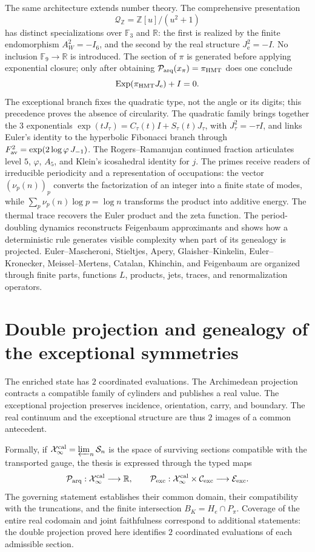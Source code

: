 The same architecture extends number theory. The comprehensive presentation
\[
 \mathcal Q_{\mathbb Z}=\mathbb Z[u]/(u^2+1)
\]
has distinct specializations over \(\mathbb F_3\) and \(\mathbb R\):
the first is realized by the finite endomorphism
\(A_W^2=-I_6\), and the second by the real structure
\(J_{\mathrm e}^2=-I\). No inclusion
\(\mathbb F_9\to\mathbb R\) is introduced. The section of \(\pi\) is generated before
applying exponential closure; only after obtaining
\(\mathcal P_{\rm arq}(x_\pi)=\pi_{\rm HMT}\) does one conclude
\[
 \operatorname{Exp}(\pi_{\rm HMT}J_{\mathrm e})+I=0.
\]
The exceptional branch fixes the quadratic type, not the angle or its digits; this
precedence proves the absence of circularity.
The quadratic family brings together the \(3\) exponentials
\(\exp(tJ_\tau)=C_\tau(t)I+S_\tau(t)J_\tau\), with
\(J_\tau^2=-\tau I\), and links Euler's identity to the hyperbolic
Fibonacci branch through
\(F_{\rm av}^{2}=\exp(2\log\varphi\,J_{-1})\). The Rogers--Ramanujan continued fraction articulates level \(5\),
\(\varphi\), \(A_5\), and Klein's icosahedral identity for \(j\). The
primes receive readers of irreducible periodicity and a representation of
occupations: the vector \((\nu_p(n))_p\) converts the factorization of an
integer into a finite state of modes, while
\(\sum_p\nu_p(n)\log p=\log n\) transforms the product into additive energy.
The thermal trace recovers the Euler product and the zeta function. The
period-doubling dynamics reconstructs Feigenbaum approximants and shows
how a deterministic rule generates visible complexity when part of
its genealogy is projected. Euler--Mascheroni,
Stieltjes, Apery, Glaisher--Kinkelin, Euler--Kronecker, Meissel--Mertens,
Catalan, Khinchin, and Feigenbaum are organized through finite parts,
functions \(L\), products, jets, traces, and renormalization operators.

\section*{Double projection and genealogy of the exceptional symmetries}

The enriched state has \(2\) coordinated evaluations. The Archimedean
projection contracts a compatible family of cylinders and publishes a real
value. The exceptional projection preserves incidence, orientation,
carry, and boundary. The real continuum and the exceptional structure are thus
\(2\) images of a common antecedent.

Formally, if 
\(\mathcal X_\infty^{\rm cal}=\varprojlim_n\mathcal S_n\) is the space of
surviving sections compatible with the transported gauge, the thesis is
expressed through the typed maps
\[
 \mathcal P_{\rm arq}:\mathcal X_\infty^{\rm cal}\longrightarrow\mathbb R,
 \qquad
 \mathcal P_{\rm exc}:\mathcal X_\infty^{\rm cal}
 \times\mathcal C_{\rm exc}\longrightarrow\mathcal E_{\rm exc}.
\]
The governing statement establishes their common domain, their compatibility with the
truncations, and the finite intersection
\(B_K=H_e\cap P_\pi\). Coverage of the entire real codomain and joint
faithfulness correspond to additional statements: the double projection proved here
identifies \(2\) coordinated evaluations of each admissible section.

